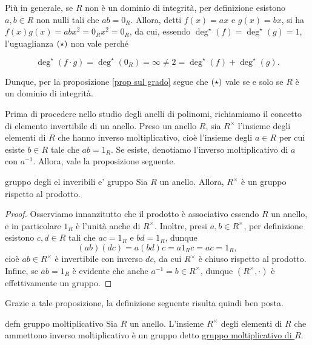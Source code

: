 \noindent Più in generale, se $R$ non è un dominio di integrità, per definizione esistono $a,b\in R$ non nulli 
tali che $ab=0_R$. Allora, detti $f(x)=ax$ e $g(x)=bx$, si ha $f(x)g(x)=abx^2=0_Rx^2=0_R$, da cui, essendo 
$\deg^{\star}(f)=\deg^{\star}(g)=1$, l'uguaglianza $\bf{(\star)}$ non vale perché 

\[\deg^{\star}(f\cdot g)=\deg^{\star}(0_R)=\infty\neq 2=\deg^{\star}(f)+\deg^{\star}(g).\] 

\noindent Dunque, per la proposizione \ref{prop sul grado} segue che $\bf{(\star)}$ vale se e solo se $R$ è un dominio di integrità.
\vspace{1.5mm}

\noindent Prima di procedere nello studio degli anelli di polinomi, richiamiamo il concetto di elemento invertibile di un anello. 
Preso un anello $R$, sia $R^{\times}$ l'insieme degli elementi di $R$ che hanno inverso moltiplicativo, 
cioè l'insieme degli $a\in R$ per cui esiste $b\in R$ tale che $ab=1_R$. Se esiste, denotiamo l'inverso moltiplicativo 
di $a$ con $a^{-1}$. Allora, vale la proposizione seguente.

\begin{prop}[]{gruppo degli el inveribili e' gruppo}
Sia $R$ un anello. Allora, $R^{\times}$ è un gruppo rispetto al prodotto.
\end{prop}
\vspace{-4mm}
\begin{proof}
Osserviamo innanzitutto che il prodotto è associativo essendo $R$ un anello, e in particolare $1_R$ è l'unità anche di 
$R^{\times}$. Inoltre, presi $a,b\in R^{\times}$, per definizione esistono $c,d\in R$ tali che $ac=1_R$ e $bd=1_R$, 
dunque \[(ab)(dc)=a(bd)c=a1_Rc=ac=1_R,\] cioè $ab\in R^{\times}$ è invertibile con inverso $dc$, da cui $R^{\times}$ 
è chiuso rispetto al prodotto. Infine, se $ab=1_R$ è evidente che anche $a^{-1}=b\in R^{\times}$, 
dunque $(R^{\times},\cdot)$ è effettivamente un gruppo.
\end{proof}

\noindent Grazie a tale proposizione, la definizione seguente risulta quindi ben posta.

\begin{defn}[]{defn gruppo moltiplicativo}
Sia $R$ un anello. L'insieme $R^{\times}$ degli elementi di $R$ che ammettono inverso moltiplicativo è un gruppo detto 
\underline{gruppo moltiplicativo di $R$}.\footnotemark
\end{defn}


